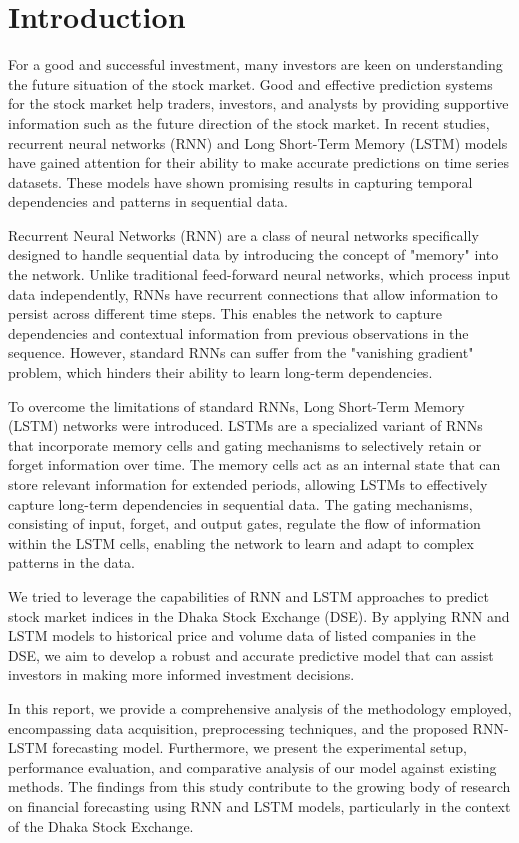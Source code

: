 \documentclass[conference]{IEEEtran}
\begin{document}
\section{Introduction}
For a good and successful investment, many investors are keen on understanding the future situation of the stock market. Good and effective prediction systems for the stock market help traders, investors, and analysts by providing supportive information such as the future direction of the stock market. In recent studies, recurrent neural networks (RNN) and Long Short-Term Memory (LSTM) models have gained attention for their ability to make accurate predictions on time series datasets. These models have shown promising results in capturing temporal dependencies and patterns in sequential data.

Recurrent Neural Networks (RNN) are a class of neural networks specifically designed to handle sequential data by introducing the concept of "memory" into the network. Unlike traditional feed-forward neural networks, which process input data independently, RNNs have recurrent connections that allow information to persist across different time steps. This enables the network to capture dependencies and contextual information from previous observations in the sequence. However, standard RNNs can suffer from the "vanishing gradient" problem, which hinders their ability to learn long-term dependencies.

To overcome the limitations of standard RNNs, Long Short-Term Memory (LSTM) networks were introduced. LSTMs are a specialized variant of RNNs that incorporate memory cells and gating mechanisms to selectively retain or forget information over time. The memory cells act as an internal state that can store relevant information for extended periods, allowing LSTMs to effectively capture long-term dependencies in sequential data. The gating mechanisms, consisting of input, forget, and output gates, regulate the flow of information within the LSTM cells, enabling the network to learn and adapt to complex patterns in the data.

We tried to leverage the capabilities of RNN and LSTM approaches to predict stock market indices in the Dhaka Stock Exchange (DSE). By applying RNN and LSTM models to historical price and volume data of listed companies in the DSE, we aim to develop a robust and accurate predictive model that can assist investors in making more informed investment decisions.

In this report, we provide a comprehensive analysis of the methodology employed, encompassing data acquisition, preprocessing techniques, and the proposed RNN-LSTM forecasting model. Furthermore, we present the experimental setup, performance evaluation, and comparative analysis of our model against existing methods. The findings from this study contribute to the growing body of research on financial forecasting using RNN and LSTM models, particularly in the context of the Dhaka Stock Exchange.
\end{document}
